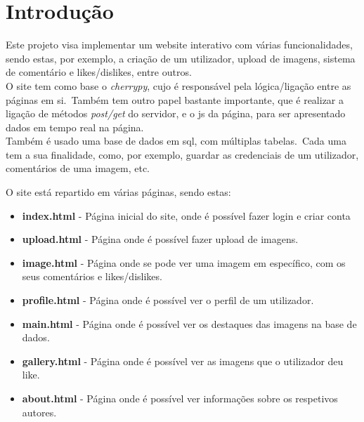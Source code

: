 \documentclass{report}
\begin{document}


\tableofcontents
\listoffigures    %


\clearpage
{}

\chapter{Introdução}
\label{chap.introducao}

Este projeto visa implementar um website interativo com várias funcionalidades, sendo estas, por exemplo, a criação de um utilizador, upload de imagens, sistema de comentário e likes/dislikes, entre outros. \\

O site tem como base o \textit{cherrypy}, cujo é responsável pela lógica/ligação entre as páginas em si.\ Também tem outro papel bastante importante, que é realizar a ligação de métodos \textit{post/get} do servidor, e o \ac{js} da página, para ser apresentado dados em tempo real na página.\\

Também é usado uma base de dados em \ac{sql}, com múltiplas tabelas.\ Cada uma tem a sua finalidade, como, por exemplo, guardar as credenciais de um utilizador, comentários de uma imagem, etc.

O site está repartido em várias páginas, sendo estas:
\begin{itemize}
    \item \textbf{index.html} - Página inicial do site, onde é possível fazer login e criar conta
    \item \textbf{upload.html} - Página onde é possível fazer upload de imagens.
    \item \textbf{image.html} - Página onde se pode ver uma imagem em específico, com os seus comentários e likes/dislikes.
    \item \textbf{profile.html} - Página onde é possível ver o perfil de um utilizador.
    \item \textbf{main.html} - Página onde é possível ver os destaques das imagens na base de dados.
    \item \textbf{gallery.html} - Página onde é possível ver as imagens que o utilizador deu like.
    \item \textbf{about.html} - Página onde é possível ver informações sobre os respetivos autores.
\end{itemize}
\end{document}
